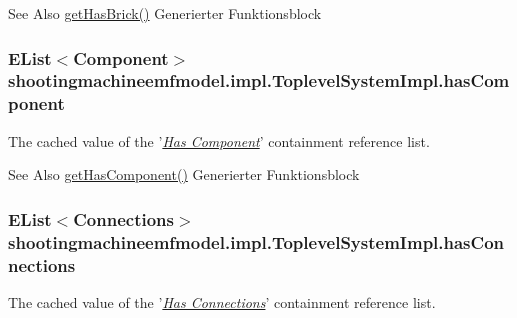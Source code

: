 \begin{DoxySeeAlso}{See Also}
\hyperlink{classshootingmachineemfmodel_1_1impl_1_1_toplevel_system_impl_abec9aaf492636fbdff5e1fba81413cc0}{get\-Has\-Brick()} Generierter Funktionsblock  
\end{DoxySeeAlso}
\hypertarget{classshootingmachineemfmodel_1_1impl_1_1_toplevel_system_impl_ad957b4842a741d20f0af80c1a2387788}{
\subsubsection[{has\-Component}]{\setlength{\rightskip}{0pt plus 5cm}E\-List$<${\bf Component}$>$ shootingmachineemfmodel.\-impl.\-Toplevel\-System\-Impl.\-has\-Component\hspace{0.3cm}{\ttfamily [protected]}}}\label{classshootingmachineemfmodel_1_1impl_1_1_toplevel_system_impl_ad957b4842a741d20f0af80c1a2387788}
The cached value of the '\hyperlink{classshootingmachineemfmodel_1_1impl_1_1_toplevel_system_impl_a2c4366fdd20080d3612a84e0e71352a7}{{\itshape Has Component}}' containment reference list.

\begin{DoxySeeAlso}{See Also}
\hyperlink{classshootingmachineemfmodel_1_1impl_1_1_toplevel_system_impl_a2c4366fdd20080d3612a84e0e71352a7}{get\-Has\-Component()} Generierter Funktionsblock  
\end{DoxySeeAlso}
\hypertarget{classshootingmachineemfmodel_1_1impl_1_1_toplevel_system_impl_af0237d255bd5b1c2cdc006971f06cd04}{
\subsubsection[{has\-Connections}]{\setlength{\rightskip}{0pt plus 5cm}E\-List$<${\bf Connections}$>$ shootingmachineemfmodel.\-impl.\-Toplevel\-System\-Impl.\-has\-Connections\hspace{0.3cm}{\ttfamily [protected]}}}\label{classshootingmachineemfmodel_1_1impl_1_1_toplevel_system_impl_af0237d255bd5b1c2cdc006971f06cd04}
The cached value of the '\hyperlink{classshootingmachineemfmodel_1_1impl_1_1_toplevel_system_impl_a6eb5ebd679d93fa77dbcbe3118defadc}{{\itshape Has Connections}}' containment reference list.

